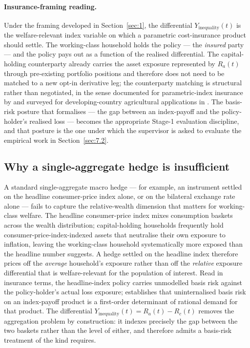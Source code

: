 \paragraph{Insurance-framing reading.} Under the framing developed in
Section~\ref{sec:1}, the differential \(Y_{\text{inequality}}(t)\) is the
welfare-relevant index variable on which a parametric cost-insurance
product should settle. The working-class household holds the policy ---
the \emph{insured} party --- and the policy pays out as a function of the
realised differential. The capital-holding counterparty already carries
the asset exposure represented by \(R_a(t)\) through pre-existing
portfolio positions and therefore does not need to be matched to a new
opt-in derivative leg; the counterparty matching is structural rather
than negotiated, in the sense documented for parametric-index insurance
by \citet{carter_etal_2017} and surveyed for developing-country
agricultural applications in \citet{mahul_stutley_2010}. The basis-risk
posture that \citet{clarke_2016} formalises --- the gap between an
index-payoff and the policy-holder's realised loss --- becomes the
appropriate Stage-1 evaluation discipline, and that posture is the one
under which the supervisor is asked to evaluate the empirical work in
Section~\ref{sec:7.2}.

\subsection{Why a single-aggregate hedge is insufficient}

A standard single-aggregate macro hedge --- for example, an instrument
settled on the headline consumer-price index alone, or on the bilateral
exchange rate alone --- fails to capture the relative-wealth dimension
that matters for working-class welfare. The headline consumer-price index
mixes consumption baskets across the wealth distribution; capital-holding
households frequently hold consumer-price-index-indexed assets that
neutralise their own exposure to inflation, leaving the working-class
household systematically more exposed than the headline number suggests.
A hedge settled on the headline index therefore prices off the
\emph{average} household's exposure rather than off the \emph{relative}
exposure differential that is welfare-relevant for the population of
interest. Read in insurance terms, the headline-index policy carries
unmodelled basis risk against the policy-holder's actual loss exposure;
\citet{clarke_2016} establishes that uninternalised basis risk on an
index-payoff product is a first-order determinant of rational demand for
that product. The differential
\(Y_{\text{inequality}}(t) = R_a(t) - R_c(t)\) removes the aggregation
problem by construction: it indexes precisely the gap between the two
baskets rather than the level of either, and therefore admits a
basis-risk treatment of the kind \citet{clarke_2016} requires.

